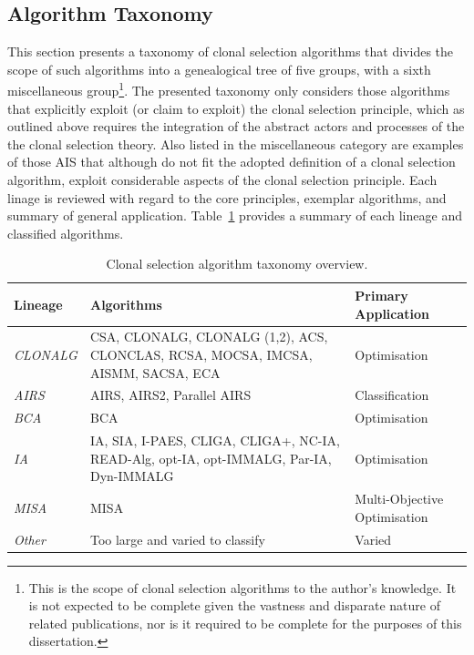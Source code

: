 %
%
\subsection{Algorithm Taxonomy}
\label{subsec:cs:algorithms:taxonomy}
This section presents a taxonomy of clonal selection algorithms that divides the scope of such algorithms into a genealogical tree of five groups, with a sixth miscellaneous group\footnote{This is the scope of clonal selection algorithms to the author's knowledge. It is not expected to be complete given the vastness and disparate nature of related publications, nor is it required to be complete for the purposes of this dissertation.}. The presented taxonomy only considers those algorithms that explicitly exploit (or claim to exploit) the clonal selection principle, which as outlined above requires the integration of the abstract actors and processes of the the clonal selection theory. Also listed in the miscellaneous category are examples of those AIS that although do not fit the adopted definition of a clonal selection algorithm, exploit considerable aspects of the clonal selection principle. Each linage is reviewed with regard to the core principles, exemplar algorithms, and summary of general application. Table~\ref{tab:cs:algorithms:taxonomy} provides a summary of each lineage and classified algorithms.

\begin{table}[ht]
	\centering\small
		\begin{tabularx}{\textwidth}{lXl}
		\toprule
		\textbf{Lineage} & \textbf{Algorithms} & \textbf{Primary Application} \\ 
		\toprule
		\emph{CLONALG} & CSA, CLONALG, CLONALG (1,2), ACS, CLONCLAS, RCSA, MOCSA, IMCSA, AISMM, SACSA, ECA & Optimisation \\ 
		\midrule
		\emph{AIRS} & AIRS, AIRS2, Parallel AIRS & Classification \\ 
		\midrule
		\emph{BCA} & BCA & Optimisation \\ 
		\midrule
		\emph{IA} & IA, SIA, I-PAES, CLIGA, CLIGA+, NC-IA, READ-Alg, opt-IA, opt-IMMALG, Par-IA, Dyn-IMMALG & Optimisation \\ 
		\midrule
		\emph{MISA} & MISA & Multi-Objective Optimisation \\ 
		\midrule
		\emph{Other} & Too large and varied to classify & Varied \\ 
		\bottomrule
		\end{tabularx}	
	\caption{Clonal selection algorithm taxonomy overview.}
	\label{tab:cs:algorithms:taxonomy}
\end{table}

